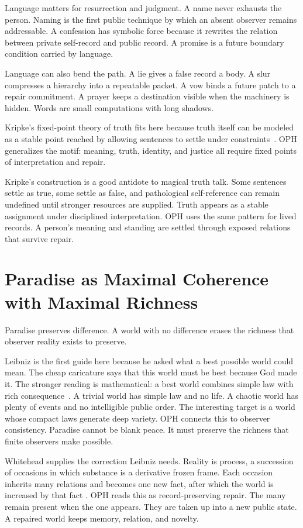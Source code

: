 \documentclass[11pt]{article}
\theoremstyle{remark}
\theoremstyle{plain}
\begin{document}
Language matters for resurrection and judgment. A name never
exhausts the person. Naming is the first public technique by which an absent
observer remains addressable. A confession has symbolic force because it rewrites the
relation between private self-record and public record. A promise is a future
boundary condition carried by language.

Language can also bend the path. A lie gives a false record a body. A slur
compresses a hierarchy into a repeatable packet. A vow binds a future patch to a
repair commitment. A prayer keeps a destination visible when the machinery is
hidden. Words are small computations with long shadows.

Kripke's fixed-point theory of truth fits here because truth itself can be
modeled as a stable point reached by allowing sentences to settle under
constraints~\cite{Kripke1975}. OPH generalizes the motif: meaning, truth,
identity, and justice all require fixed points of interpretation and repair.

Kripke's construction is a good antidote to magical truth talk. Some
sentences settle as true, some settle as false, and pathological self-reference
can remain undefined until stronger resources are supplied. Truth appears as a
stable assignment under disciplined interpretation. OPH uses the same pattern
for lived records. A person's meaning and standing are settled through exposed
relations that survive repair.

\section{Paradise as Maximal Coherence with Maximal Richness}

Paradise preserves difference. A world with no difference erases the richness
that observer reality exists to preserve.

Leibniz is the first guide here because he asked what a best possible world
could mean. The cheap caricature says that this world must be best because God
made it. The stronger reading is mathematical: a best world combines simple
law with rich consequence~\cite{Leibniz1710}. A trivial world has simple law and
no life. A chaotic world has plenty of events and no intelligible public order.
The interesting target is a world whose compact laws generate deep variety.
OPH connects this to observer consistency. Paradise cannot be blank peace. It
must preserve the richness that finite observers make possible.

Whitehead supplies the correction Leibniz needs. Reality is process, a
succession of occasions in which substance is a derivative frozen frame. Each
occasion inherits many relations and becomes one new fact, after which the world
is increased by that fact
\cite{Whitehead1929}. OPH reads this as record-preserving repair. The many
remain present when the one appears. They are taken up into a new public state. A
repaired world keeps memory, relation, and novelty.
\end{document}
